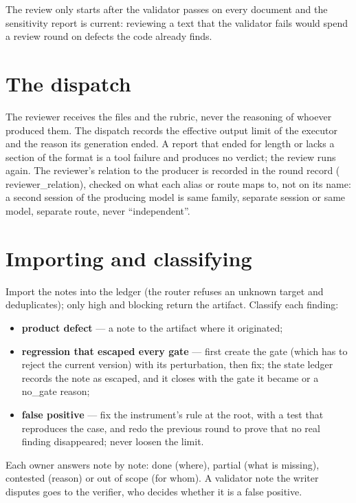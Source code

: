 \documentclass[
  american,
  10pt,
]{report}
\providecommand{\tightlist}{%
  \setlength{\itemsep}{0pt}\setlength{\parskip}{0pt}}
\renewcommand{\texttt}[1]{{\ttfamily\hyphenchar\font=-1 #1}}
\begin{document}
The review only starts after the validator passes on every document and
the sensitivity report is current: reviewing a text that the validator
fails would spend a review round on defects the code already finds.

\section{The dispatch}\label{the-dispatch}

The reviewer receives the files and the rubric, never the reasoning of
whoever produced them. The dispatch records the effective output limit
of the executor and the reason its generation ended. A report that ended
for length or lacks a section of the format is a tool failure and
produces no verdict; the review runs again. The reviewer's relation to
the producer is recorded in the round record
(\texttt{reviewer\_\allowbreak{}relation}), checked on what each alias
or route maps to, not on its name: a second session of the producing
model is \texttt{same family, separate session} or
\texttt{same model, separate route}, never ``independent''.

\section{Importing and classifying}\label{importing-and-classifying}

Import the notes into the ledger (the router refuses an unknown target
and deduplicates); only high and blocking return the artifact. Classify
each finding:

\begin{itemize}
\tightlist
\item
  \textbf{product defect} --- a note to the artifact where it
  originated;
\item
  \textbf{regression that escaped every gate} --- first create the gate
  (which has to reject the current version) with its perturbation, then
  fix; the state ledger records the note as \texttt{escaped}, and it
  closes with the \texttt{gate} it became or a
  \texttt{no\_\allowbreak{}gate} reason;
\item
  \textbf{false positive} --- fix the instrument's rule at the root,
  with a test that reproduces the case, and redo the previous round to
  prove that no real finding disappeared; never loosen the limit.
\end{itemize}

Each owner answers note by note: done (where), partial (what is
missing), contested (reason) or out of scope (for whom). A validator
note the writer disputes goes to the verifier, who decides whether it is
a false positive.
\end{document}
